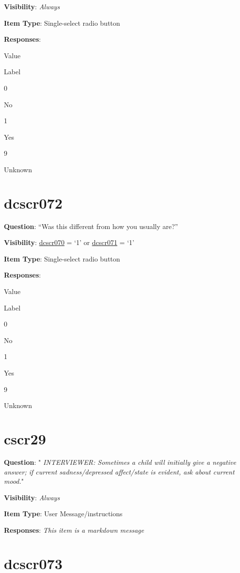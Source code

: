 \documentclass[]{book}
\begin{document}
\textbf{Visibility}: \emph{Always}

\textbf{Item Type}: Single-select radio button

\textbf{Responses}:

Value

Label

0

No

1

Yes

9

Unknown

\hypertarget{dcscr072}{%
\section{dcscr072}\label{dcscr072}}

\textbf{Question}: ``Was this different from how you usually are?''

\textbf{Visibility}: \protect\hyperlink{dcscr070}{dcscr070} = `1' or \protect\hyperlink{dcscr071}{dcscr071} = `1'

\textbf{Item Type}: Single-select radio button

\textbf{Responses}:

Value

Label

0

No

1

Yes

9

Unknown

\hypertarget{cscr29}{%
\section{cscr29}\label{cscr29}}

\textbf{Question}: "
\emph{INTERVIEWER: Sometimes a child will initially give a negative answer; if current sadness/depressed affect/state is evident, ask about current mood.}"

\textbf{Visibility}: \emph{Always}

\textbf{Item Type}: User Message/instructions

\textbf{Responses}: \emph{This item is a markdown message}

\hypertarget{dcscr073}{%
\section{dcscr073}\label{dcscr073}}
\end{document}
